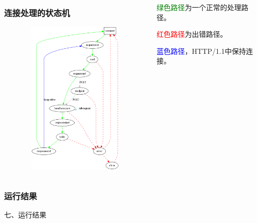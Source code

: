 \documentclass[10pt,dvipdfm]{beamer}
\begin{document}
\begin{frame}
	\begin{columns}
	
	\begin{column}{0.6\textwidth}
		\frametitle{连接处理的状态机}
		\begin{figure}[htbp]
		\centering
		\includegraphics[height=7.5cm, width=6cm]{pics/state.eps}
		\end{figure}
	\end{column}
	
	\begin{column}{0.3\textwidth}
		\begin{block}{}
			\textcolor{green}{绿色路径}为一个正常的处理路径。\\
		\end{block}
		\begin{block}{}
			\textcolor{red}{红色路径}为出错路径。\\
		\end{block}
		\begin{block}{}	
			\textcolor{blue}{蓝色路径}，HTTP/1.1中保持连接。
		\end{block}
	\end{column}
	
	\end{columns}
	
\end{frame}


\begin{frame}
	\frametitle{运行结果}
	\begin{center}
	{\Large
		七、运行结果
	}
	\end{center}
\end{frame}
\end{document}
